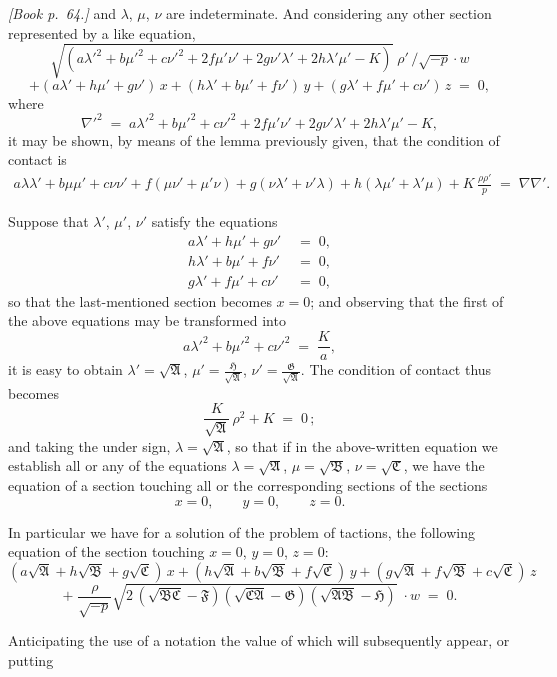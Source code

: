 \documentclass[11pt]{article}
\providecommand{\fA}{\mathfrak{A}}
\providecommand{\fB}{\mathfrak{B}}
\providecommand{\fC}{\mathfrak{C}}
\providecommand{\fF}{\mathfrak{F}}
\providecommand{\fG}{\mathfrak{G}}
\providecommand{\fH}{\mathfrak{H}}
\begin{document}
\bigskip

\noindent\emph{[Book p.~64.]} and $\lambda$, $\mu$, $\nu$ are indeterminate. And considering any other section represented by a like equation,
\[
\sqrt{(a\lambda'^{2} + b\mu'^{2} + c\nu'^{2} + 2f\mu'\nu' + 2g\nu'\lambda' + 2h\lambda'\mu' - K)}\;\rho'\,/\sqrt{-p}\cdot w
\]
\[
+ (a\lambda' + h\mu' + g\nu')\,x + (h\lambda' + b\mu' + f\nu')\,y + (g\lambda' + f\mu' + c\nu')\,z \;=\; 0,
\]
where
\[
\nabla'^{2} \;=\; a\lambda'^{2} + b\mu'^{2} + c\nu'^{2} + 2f\mu'\nu' + 2g\nu'\lambda' + 2h\lambda'\mu' - K,
\]
it may be shown, by means of the lemma previously given, that the condition of contact is
\begin{align*}
a\lambda\lambda' + b\mu\mu' + c\nu\nu' + f(\mu\nu' + \mu'\nu) + g(\nu\lambda' + \nu'\lambda) + h(\lambda\mu' + \lambda'\mu) + K\,\tfrac{\rho\rho'}{p}
\;=\; \nabla\nabla'.
\end{align*}

Suppose that $\lambda'$, $\mu'$, $\nu'$ satisfy the equations
\begin{align*}
a\lambda' + h\mu' + g\nu' &\;=\; 0,\\
h\lambda' + b\mu' + f\nu' &\;=\; 0,\\
g\lambda' + f\mu' + c\nu' &\;=\; 0,
\end{align*}
so that the last-mentioned section becomes $x = 0$; and observing that the first of the above equations may be transformed into
\[
a\lambda'^{2} + b\mu'^{2} + c\nu'^{2} \;=\; \frac{K}{a},
\]
it is easy to obtain $\lambda' = \sqrt{\fA}$, $\mu' = \tfrac{\fH}{\sqrt{\fA}}$, $\nu' = \tfrac{\fG}{\sqrt{\fA}}$. The condition of contact thus becomes
\[
\frac{K}{\sqrt{\fA}}\,\rho^{2} + K \;=\; 0\,;
\]
and taking the under sign, $\lambda = \sqrt{\fA}$, so that if in the above-written equation we establish all or any of the equations $\lambda = \sqrt{\fA}$, $\mu = \sqrt{\fB}$, $\nu = \sqrt{\fC}$, we have the equation of a section touching all or the corresponding sections of the sections
\[
x = 0,\qquad y = 0,\qquad z = 0.
\]

In particular we have for a solution of the problem of tactions, the following equation of the section touching $x = 0$, $y = 0$, $z = 0$:
\[
(a\sqrt{\fA} + h\sqrt{\fB} + g\sqrt{\fC})\,x + (h\sqrt{\fA} + b\sqrt{\fB} + f\sqrt{\fC})\,y + (g\sqrt{\fA} + f\sqrt{\fB} + c\sqrt{\fC})\,z
\]
\[
+\;\frac{\rho}{\sqrt{-p}}\sqrt{2\,(\sqrt{\fB\fC} - \fF)(\sqrt{\fC\fA} - \fG)(\sqrt{\fA\fB} - \fH)} \;\cdot w \;=\; 0.
\]

Anticipating the use of a notation the value of which will subsequently appear, or putting
\end{document}
